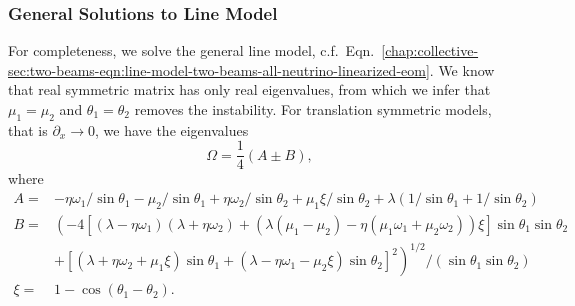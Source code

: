 




\subsubsection{General Solutions to Line Model}


For completeness, we solve the general line model, c.f.~Eqn.~\ref{chap:collective-sec:two-beams-eqn:line-model-two-beams-all-neutrino-linearized-eom}. We know that real symmetric matrix has only real eigenvalues, from which we infer that $\mu_1=\mu_2$ and $\theta_1=\theta_2$ removes the instability.
For translation symmetric models, that is $\partial_x\to 0$, we have the eigenvalues
\begin{equation*}
   \Omega = \frac{1}{4}(A\pm B),
\end{equation*}
where
\begin{align*}
   A=& -\eta \omega_1/\sin\theta_1 - \mu_2 /\sin\theta_1 + \eta \omega_2 /\sin\theta_2 + \mu_1 \xi /\sin\theta_2 + \lambda(1/\sin\theta_1 + 1/\sin\theta_2)  \\
   B=& \left(
      -4[(\lambda-\eta\omega_1)(\lambda +\eta\omega_2) + (\lambda (\mu_1-\mu_2) -\eta (\mu_1\omega_1 + \mu_2\omega_2) )\xi ] \sin\theta_1 \sin\theta_2\right. \\
      &\left.+ [(\lambda + \eta\omega_2 + \mu_1\xi) \sin\theta_1 + (\lambda - \eta \omega_1 - \mu_2\xi) \sin\theta_2 ]^2
   \right)^{1/2}/(\sin\theta_1\sin\theta_2)\\
   \xi=&1-\cos(\theta_1-\theta_2).
\end{align*}


